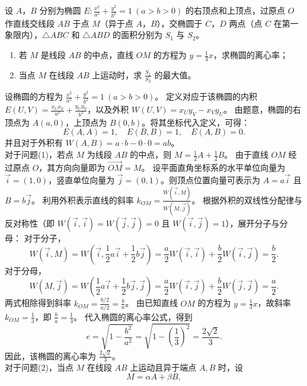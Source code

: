 \begin{example}
设 \(A\)，\(B\) 分别为椭圆 \(E: \frac{x^2}{a^2} + \frac{y^2}{b^2} = 1\ (a > b > 0)\) 的右顶点和上顶点，过原点 \(O\) 作直线交线段 \(AB\) 于点 \(M\)（异于点 \(A\)，\(B\)），交椭圆于 \(C\)，\(D\) 两点（点 \(C\) 在第一象限内），\(\triangle ABC\) 和 \(\triangle ABD\) 的面积分别为 \(S_1\) 与 \(S_2\)。
\begin{enumerate}
    \item[(1)] 若 \(M\) 是线段 \(AB\) 的中点，直线 \(OM\) 的方程为 \(y = \frac{1}{3}x\)，求椭圆的离心率；
    \item[(2)] 当点 \(M\) 在线段 \(AB\) 上运动时，求 \(\frac{S_1}{S_2}\) 的最大值。
\end{enumerate}
\end{example}
\begin{solution}
设椭圆的方程为 $\frac{x^2}{a^2} + \frac{y^2}{b^2} = 1\ (a > b > 0)$。
定义对应于该椭圆的内积 $E(U, V) = \frac{x_U x_V}{a^2} + \frac{y_U y_V}{b^2}$，以及外积 $W(U, V) = x_U y_V - x_V y_U$。
由题意，椭圆的右顶点为 $A(a,0)$，上顶点为 $B(0,b)$。将其坐标代入定义，可得：
\[ E(A, A) = 1, \quad E(B, B) = 1, \quad E(A, B) = 0. \]
并且对于外积有 $W(A, B) = a \cdot b - 0 \cdot 0 = ab$。\\
对于问题(1)，若点 $M$ 为线段 $AB$ 的中点，则 $M = \frac{1}{2}A + \frac{1}{2}B$。
由于直线 $OM$ 经过原点 $O$，其方向向量即为 $\overrightarrow{OM} = M$。
设平面直角坐标系的水平单位向量为 $\vec{i} = (1, 0)$，竖直单位向量为 $\vec{j} = (0, 1)$。则顶点位置向量可表示为 $A = a\vec{i}$ 且 $B = b\vec{j}$。
利用外积表示直线的斜率 $k_{OM} = \frac{W(\vec{i}, M)}{W(M, \vec{j})}$。
根据外积的双线性分配律与反对称性（即 $W(\vec{i}, \vec{i}) = W(\vec{j}, \vec{j}) = 0$ 且 $W(\vec{i}, \vec{j}) = 1$），展开分子与分母：
对于分子，
\[ W(\vec{i}, M) = W\left(\vec{i}, \frac{1}{2}a\vec{i} + \frac{1}{2}b\vec{j}\right) = \frac{a}{2}W(\vec{i}, \vec{i}) + \frac{b}{2}W(\vec{i}, \vec{j}) = \frac{b}{2}. \]
对于分母，
\[ W(M, \vec{j}) = W\left(\frac{1}{2}a\vec{i} + \frac{1}{2}b\vec{j}, \vec{j}\right) = \frac{a}{2}W(\vec{i}, \vec{j}) + \frac{b}{2}W(\vec{j}, \vec{j}) = \frac{a}{2}. \]
两式相除得到斜率 $k_{OM} = \frac{b/2}{a/2} = \frac{b}{a}$。
由已知直线 $OM$ 的方程为 $y = \frac{1}{3}x$，故斜率 $k_{OM} = \frac{1}{3}$，即 $\frac{b}{a} = \frac{1}{3}$。
代入椭圆的离心率公式，得到
\[ e = \sqrt{1 - \frac{b^2}{a^2}} = \sqrt{1 - \left(\frac{1}{3}\right)^2} = \frac{2\sqrt{2}}{3}. \]
因此，该椭圆的离心率为 $\frac{2\sqrt{2}}{3}$。\\
对于问题(2)，当点 $M$ 在线段 $AB$ 上运动且异于端点 $A, B$ 时，设
\[ M = \alpha A + \beta B, \]

\end{solution}
